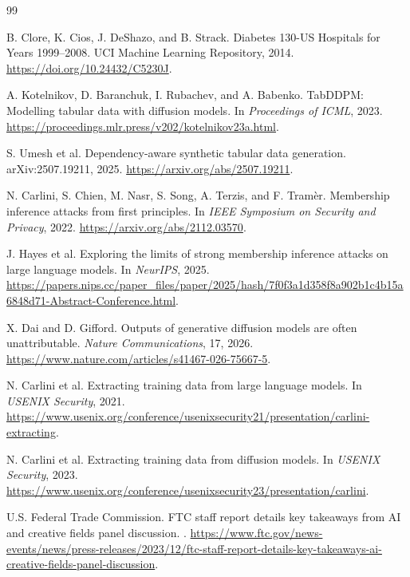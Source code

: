 \documentclass[11pt]{article}
\begin{document}
\begin{thebibliography}{99}

B. Clore, K. Cios, J. DeShazo, and B. Strack.
\newblock Diabetes 130-US Hospitals for Years 1999--2008.
\newblock UCI Machine Learning Repository, 2014.
\newblock \url{https://doi.org/10.24432/C5230J}.

A. Kotelnikov, D. Baranchuk, I. Rubachev, and A. Babenko.
\newblock TabDDPM: Modelling tabular data with diffusion models.
\newblock In \emph{Proceedings of ICML}, 2023.
\newblock \url{https://proceedings.mlr.press/v202/kotelnikov23a.html}.

S. Umesh et al.
\newblock Dependency-aware synthetic tabular data generation.
\newblock arXiv:2507.19211, 2025.
\newblock \url{https://arxiv.org/abs/2507.19211}.

N. Carlini, S. Chien, M. Nasr, S. Song, A. Terzis, and F. Tram\`er.
\newblock Membership inference attacks from first principles.
\newblock In \emph{IEEE Symposium on Security and Privacy}, 2022.
\newblock \url{https://arxiv.org/abs/2112.03570}.

J. Hayes et al.
\newblock Exploring the limits of strong membership inference attacks on large language models.
\newblock In \emph{NeurIPS}, 2025.
\newblock \url{https://papers.nips.cc/paper_files/paper/2025/hash/7f0f3a1d358f8a902b1c4b15a6848d71-Abstract-Conference.html}.

X. Dai and D. Gifford.
\newblock Outputs of generative diffusion models are often unattributable.
\newblock \emph{Nature Communications}, 17, 2026.
\newblock \url{https://www.nature.com/articles/s41467-026-75667-5}.

N. Carlini et al.
\newblock Extracting training data from large language models.
\newblock In \emph{USENIX Security}, 2021.
\newblock \url{https://www.usenix.org/conference/usenixsecurity21/presentation/carlini-extracting}.

N. Carlini et al.
\newblock Extracting training data from diffusion models.
\newblock In \emph{USENIX Security}, 2023.
\newblock \url{https://www.usenix.org/conference/usenixsecurity23/presentation/carlini}.

U.S. Federal Trade Commission.
\newblock FTC staff report details key takeaways from AI and creative fields panel discussion.
.
\newblock \url{https://www.ftc.gov/news-events/news/press-releases/2023/12/ftc-staff-report-details-key-takeaways-ai-creative-fields-panel-discussion}.

\end{thebibliography}
\end{document}
